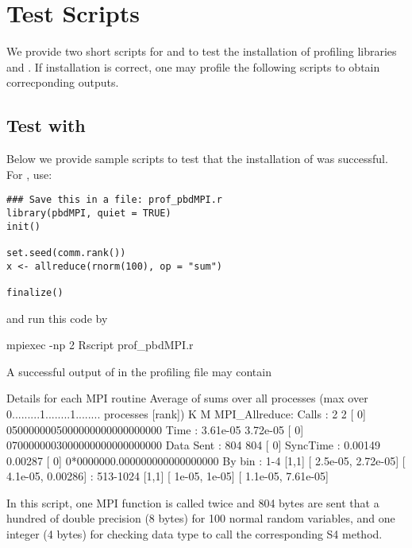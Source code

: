 \section{Test Scripts}

We provide two short  scripts for  and 
to test the installation of profiling libraries and .
If installation is correct, one may profile the following scripts to obtain
correcponding outputs.


\subsection{Test with }

Below we provide sample scripts to test that the installation of
 was successful.  For , use:
\begin{lstlisting}[title=Test script for pbdMPI]
### Save this in a file: prof_pbdMPI.r
library(pbdMPI, quiet = TRUE)
init()

set.seed(comm.rank())
x <- allreduce(rnorm(100), op = "sum")

finalize()
\end{lstlisting}
and run this code by
\begin{Code}
mpiexec -np 2 Rscript prof_pbdMPI.r
\end{Code}

A successful output of 
in the profiling file  may contain
\begin{Output}
Details for each MPI routine
                  Average of sums over all processes
                                (max over          0.........1........1........
                                 processes [rank])           K        M
MPI_Allreduce:
        Calls     :          2            2 [   0] 0500000005000000000000000000
        Time      :   3.61e-05     3.72e-05 [   0] 0700000003000000000000000000
        Data Sent :        804          804 [   0]
        SyncTime  :    0.00149      0.00287 [   0] 0*0000000.000000000000000000
        By bin    : 1-4 [1,1]   [   2.5e-05,  2.72e-05] [   4.1e-05,   0.00286]
                  : 513-1024    [1,1]   [     1e-05,     1e-05] [   1.1e-05,  7.61e-05]
\end{Output}
In this  script,
one MPI  function  is called twice and
804 bytes are sent that a hundred of double precision (8 bytes) for
100 normal random variables, and one integer (4 bytes) for checking
data type to call the corresponding S4 method.


